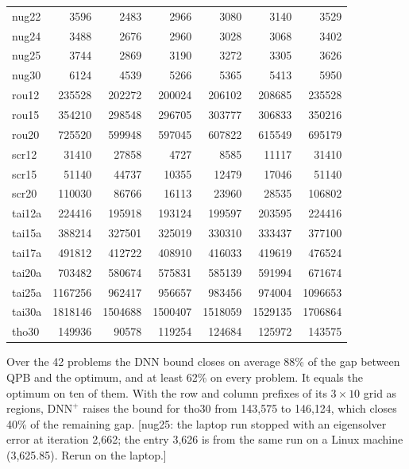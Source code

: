 \documentclass[11pt]{article}
\theoremstyle{remark}
\newcommand{\DNNp}{\mathrm{DNN}^{+}}
\newcommand{\todo}[1]{{\color{red}[#1]}}
\begin{document}
\begin{table}[p]
\begin{tabular}{lrrrrrr}
nug22 & 3596 & 2483 & 2966 & 3080 & 3140 & 3529\\
nug24 & 3488 & 2676 & 2960 & 3028 & 3068 & 3402\\
nug25 & 3744 & 2869 & 3190 & 3272 & 3305 & 3626\\
nug30 & 6124 & 4539 & 5266 & 5365 & 5413 & 5950\\
\midrule
rou12 & 235528 & 202272 & 200024 & 206102 & 208685 & 235528\\
rou15 & 354210 & 298548 & 296705 & 303777 & 306833 & 350216\\
rou20 & 725520 & 599948 & 597045 & 607822 & 615549 & 695179\\
\midrule
scr12 & 31410 & 27858 & 4727 & 8585 & 11117 & 31410\\
scr15 & 51140 & 44737 & 10355 & 12479 & 17046 & 51140\\
scr20 & 110030 & 86766 & 16113 & 23960 & 28535 & 106802\\
\midrule
tai12a & 224416 & 195918 & 193124 & 199597 & 203595 & 224416\\
tai15a & 388214 & 327501 & 325019 & 330310 & 333437 & 377100\\
tai17a & 491812 & 412722 & 408910 & 416033 & 419619 & 476524\\
tai20a & 703482 & 580674 & 575831 & 585139 & 591994 & 671674\\
tai25a & 1167256 & 962417 & 956657 & 983456 & 974004 & 1096653\\
tai30a & 1818146 & 1504688 & 1500407 & 1518059 & 1529135 & 1706864\\
\midrule
tho30 & 149936 & 90578 & 119254 & 124684 & 125972 & 143575\\
\bottomrule
\end{tabular}
\end{table}

Over the 42 problems the DNN bound closes on average 88\% of the gap between
QPB and the optimum, and at least 62\% on every problem. It equals the optimum
on ten of them. With the row and column prefixes of its $3\times 10$ grid as
regions, $\DNNp$ raises the bound for tho30 from 143,575 to 146,124, which
closes 40\% of the remaining gap.
\todo{nug25: the laptop run stopped with an eigensolver error at iteration
2,662; the entry 3,626 is from the same run on a Linux machine (3,625.85).
Rerun on the laptop.}
\end{document}
